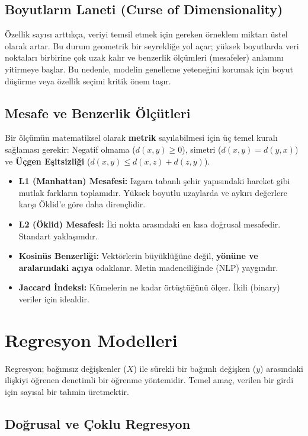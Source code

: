 \documentclass[12pt,a4paper]{article}
\begin{document}
\subsection{Boyutların Laneti (Curse of Dimensionality)}
Özellik sayısı arttıkça, veriyi temsil etmek için gereken örneklem miktarı üstel olarak artar. Bu durum geometrik bir seyrekliğe yol açar; yüksek boyutlarda veri noktaları birbirine çok uzak kalır ve benzerlik ölçümleri (mesafeler) anlamını yitirmeye başlar. Bu nedenle, modelin genelleme yeteneğini korumak için boyut düşürme veya özellik seçimi kritik önem taşır.

\subsection{Mesafe ve Benzerlik Ölçütleri}
Bir ölçümün matematiksel olarak \textbf{metrik} sayılabilmesi için üç temel kuralı sağlaması gerekir: Negatif olmama ($d(x,y) \geq 0$), simetri ($d(x,y)=d(y,x)$) ve \textbf{Üçgen Eşitsizliği} ($d(x,y) \leq d(x,z) + d(z,y)$).

\begin{itemize}
    \item \textbf{L1 (Manhattan) Mesafesi:} Izgara tabanlı şehir yapısındaki hareket gibi mutlak farkların toplamıdır. Yüksek boyutlu uzaylarda ve aykırı değerlere karşı Öklid'e göre daha dirençlidir.
    \item \textbf{L2 (Öklid) Mesafesi:} İki nokta arasındaki en kısa doğrusal mesafedir. Standart yaklaşımdır.
    \item \textbf{Kosinüs Benzerliği:} Vektörlerin büyüklüğüne değil, \textbf{yönüne ve aralarındaki açıya} odaklanır. Metin madenciliğinde (NLP) yaygındır.
    \item \textbf{Jaccard İndeksi:} Kümelerin ne kadar örtüştüğünü ölçer. İkili (binary) veriler için idealdir.
\end{itemize}

\newpage
\section{Regresyon Modelleri}
Regresyon; bağımsız değişkenler ($X$) ile sürekli bir bağımlı değişken ($y$) arasındaki ilişkiyi öğrenen denetimli bir öğrenme yöntemidir. Temel amaç, verilen bir girdi için sayısal bir tahmin üretmektir.

\subsection{Doğrusal ve Çoklu Regresyon}
\end{document}
